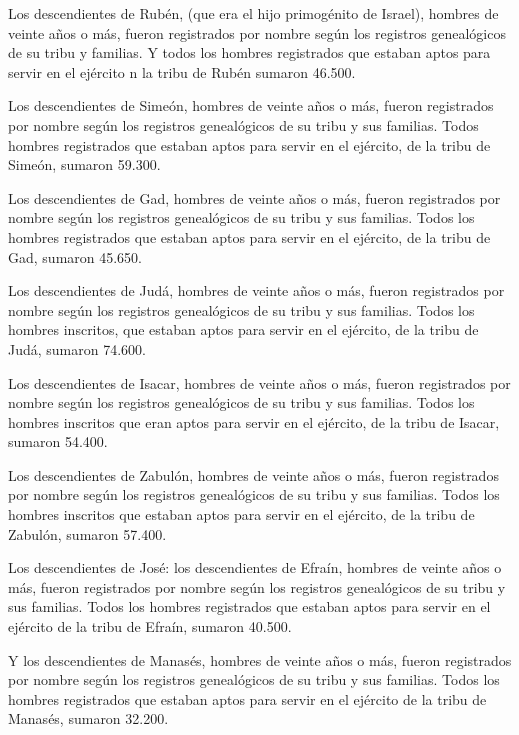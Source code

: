  Los descendientes de Rubén, (que era el hijo primogénito
de Israel), hombres de veinte años o más, fueron registrados por nombre
según los registros genealógicos de su tribu y familias. Y todos los
hombres registrados que estaban aptos para servir en el ejército
 n la tribu de Rubén sumaron 46.500.

 Los descendientes de Simeón, hombres de veinte años o más,
fueron registrados por nombre según los registros genealógicos de su
tribu y sus familias. Todos hombres registrados que estaban aptos para
servir en el ejército,  de la tribu de Simeón, sumaron
59.300.

 Los descendientes de Gad, hombres de veinte años o más,
fueron registrados por nombre según los registros genealógicos de su
tribu y sus familias. Todos los hombres registrados que estaban aptos
para servir en el ejército,  de la tribu de Gad, sumaron
45.650.

 Los descendientes de Judá, hombres de veinte años o más,
fueron registrados por nombre según los registros genealógicos de su
tribu y sus familias. Todos los hombres inscritos, que estaban aptos
para servir en el ejército,  de la tribu de Judá, sumaron
74.600.

 Los descendientes de Isacar, hombres de veinte años o más,
fueron registrados por nombre según los registros genealógicos de su
tribu y sus familias. Todos los hombres inscritos que eran aptos para
servir en el ejército,  de la tribu de Isacar, sumaron
54.400.

 Los descendientes de Zabulón, hombres de veinte años o
más, fueron registrados por nombre según los registros genealógicos de
su tribu y sus familias. Todos los hombres inscritos que estaban aptos
para servir en el ejército,  de la tribu de Zabulón,
sumaron 57.400.

 Los descendientes de José: los descendientes de Efraín,
hombres de veinte años o más, fueron registrados por nombre según los
registros genealógicos de su tribu y sus familias. Todos los hombres
registrados que estaban aptos para servir en el ejército 
de la tribu de Efraín, sumaron 40.500.

 Y los descendientes de Manasés, hombres de veinte años o
más, fueron registrados por nombre según los registros genealógicos de
su tribu y sus familias. Todos los hombres registrados que estaban aptos
para servir en el ejército  de la tribu de Manasés, sumaron
32.200.

